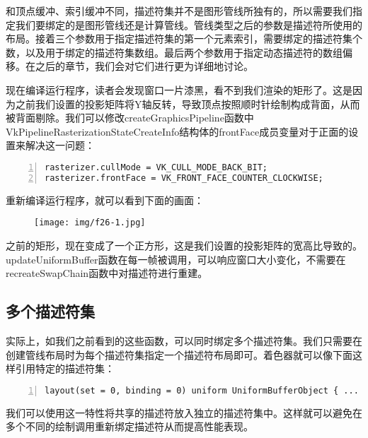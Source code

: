 \documentclass{ctexart}
\begin{document}
和顶点缓冲、索引缓冲不同，描述符集并不是图形管线所独有的，所以需要我们指定我们要绑定的是图形管线还是计算管线。管线类型之后的参数是描述符所使用的布局。接着三个参数用于指定描述符集的第一个元素索引，需要绑定的描述符集个数，以及用于绑定的描述符集数组。最后两个参数用于指定动态描述符的数组偏移。在之后的章节，我们会对它们进行更为详细地讨论。

现在编译运行程序，读者会发现窗口一片漆黑，看不到我们渲染的矩形了。这是因为之前我们设置的投影矩阵将Y轴反转，导致顶点按照顺时针绘制构成背面，从而被背面剔除。我们可以修改createGraphicsPipeline函数中VkPipelineRasterizationStateCreateInfo结构体的frontFace成员变量对于正面的设置来解决这一问题：

\begin{lstlisting}[language={[ANSI]C},keywordstyle=\color{blue!70},commentstyle=\color{red!50!green!50!blue!50},frame=shadowbox, rulesepcolor=\color{red!20!green!20!blue!20},basicstyle=\small,numbers=left, numberstyle=\tiny,breaklines=true]
rasterizer.cullMode = VK_CULL_MODE_BACK_BIT;
rasterizer.frontFace = VK_FRONT_FACE_COUNTER_CLOCKWISE;
\end{lstlisting}

重新编译运行程序，就可以看到下面的画面：

\begin{figure}[H]
	\centering
	\texttt{[image: img/f26-1.jpg]}
\end{figure}

之前的矩形，现在变成了一个正方形，这是我们设置的投影矩阵的宽高比导致的。updateUniformBuffer函数在每一帧被调用，可以响应窗口大小变化，不需要在recreateSwapChain函数中对描述符进行重建。

\subsection{多个描述符集}

实际上，如我们之前看到的这些函数，可以同时绑定多个描述符集。我们只需要在创建管线布局时为每个描述符集指定一个描述符布局即可。着色器就可以像下面这样引用特定的描述符集：

\begin{lstlisting}[language={[ANSI]C},keywordstyle=\color{blue!70},commentstyle=\color{red!50!green!50!blue!50},frame=shadowbox, rulesepcolor=\color{red!20!green!20!blue!20},basicstyle=\small,numbers=left, numberstyle=\tiny,breaklines=true]
layout(set = 0, binding = 0) uniform UniformBufferObject { ... }
\end{lstlisting}

我们可以使用这一特性将共享的描述符放入独立的描述符集中。这样就可以避免在多个不同的绘制调用重新绑定描述符从而提高性能表现。
\end{document}
